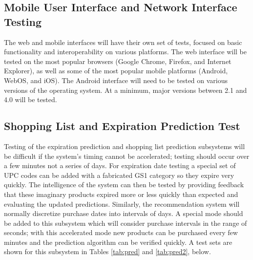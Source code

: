 \documentclass[11pt,letterpaper]{article}
\begin{document}
\subsection{Mobile User Interface and Network Interface Testing}
The web and mobile interfaces will have their own set of tests, focused on basic functionality and interoperability on various platforms.  The web interface will be tested on the most popular browsers (Google Chrome, Firefox, and Internet Explorer), as well as some of the most popular mobile platforms (Android, WebOS, and iOS).  The Android interface will need to be tested on various versions of the operating system.  At a minimum, major versions between 2.1 and 4.0 will be tested.  
\subsection{Shopping List and Expiration Prediction Test}
Testing of the expiration prediction and shopping list prediction subsystems will be difficult if the system's timing cannot be accelerated; testing should occur over a few minutes not a series of days. For expiration date testing a special set of UPC codes can be added with a fabricated GS1 category so they expire very quickly. The intelligence of the system can then be tested by providing feedback that these imaginary products expired more or less quickly than expected and evaluating the updated predictions. Similarly, the recommendation system will normally discretize purchase dates into intervals of days. A special mode should be added to this subsystem which will consider purchase intervals in the range of seconds; with this accelerated mode new products can be purchased every few minutes and the prediction algorithm can be verified quickly. A test sets are shown for this subsystem in Tables \ref{tab:pred} and \ref{tab:pred2}, below.
\end{document}
